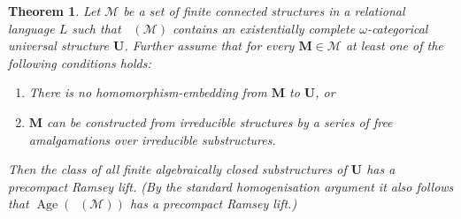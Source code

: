 \documentclass{elsarticle}
\def\Forbm{\mathop{\mathrm{Forb_m}}\nolimits}
\def\Age{\mathop{\mathrm{Age}}\nolimits}
\def\str#1{\mathbf {#1}}
\theoremstyle{plain}
\newtheorem{theorem}{Theorem}[section]
\theoremstyle{definition}
\theoremstyle{remark}
\begin{document}
\begin{theorem}
\label{thm:CSSramsey}
Let $\mathcal M$ be a set of finite connected structures in a relational language $L$ such that $\Forbm(\mathcal M)$
contains an existentially complete $\omega$-categorical universal structure $\str{U}$.
Further assume that for every $\str{M}\in \mathcal M$ at least one of the following conditions holds:
\begin{enumerate}
  \item There is no homomorphism-embedding from $\str{M}$ to $\str{U}$, or
  \item $\str{M}$ can be constructed from irreducible structures by a series of free amalgamations over irreducible substructures.
\end{enumerate}
Then the class of all finite algebraically closed substructures of $\str{U}$ has a precompact Ramsey lift.
(By the standard homogenisation argument it also follows that $\Age(\Forbm(\mathcal M))$ has a precompact Ramsey lift.)
\end{theorem}
\end{document}
